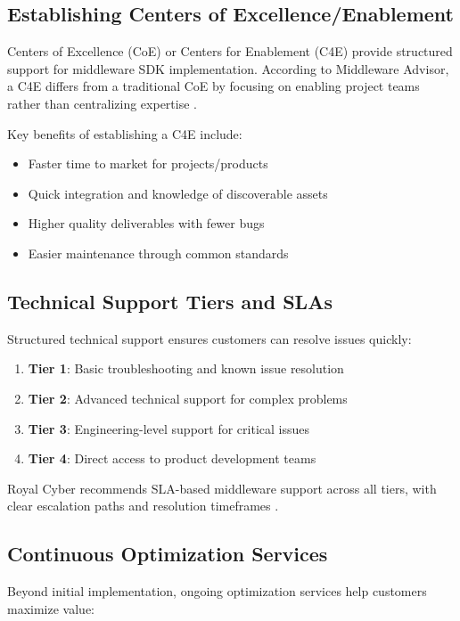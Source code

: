 \documentclass[11pt,a4paper]{article}
\begin{document}
\subsection{Establishing Centers of Excellence/Enablement}

Centers of Excellence (CoE) or Centers for Enablement (C4E) provide structured support for middleware SDK implementation. According to Middleware Advisor, a C4E differs from a traditional CoE by focusing on enabling project teams rather than centralizing expertise \cite{middlewareadvisor2023}.

Key benefits of establishing a C4E include:
\begin{itemize}
    \item Faster time to market for projects/products
    \item Quick integration and knowledge of discoverable assets
    \item Higher quality deliverables with fewer bugs
    \item Easier maintenance through common standards
\end{itemize}

\subsection{Technical Support Tiers and SLAs}

Structured technical support ensures customers can resolve issues quickly:

\begin{enumerate}
    \item \textbf{Tier 1}: Basic troubleshooting and known issue resolution
    \item \textbf{Tier 2}: Advanced technical support for complex problems
    \item \textbf{Tier 3}: Engineering-level support for critical issues
    \item \textbf{Tier 4}: Direct access to product development teams
\end{enumerate}

Royal Cyber recommends SLA-based middleware support across all tiers, with clear escalation paths and resolution timeframes \cite{royalcyber2023}.

\subsection{Continuous Optimization Services}

Beyond initial implementation, ongoing optimization services help customers maximize value:
\end{document}
